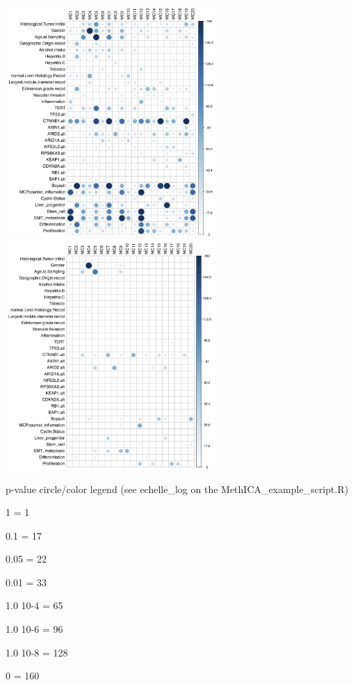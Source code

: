 \documentclass[]{article}
\begin{document}
\includegraphics[width=0.6\textwidth,height=0.6\textheight]{./corrplot_uni.png}
\includegraphics[width=0.6\textwidth,height=0.6\textheight]{./corrplot_multi.png}

p-value circle/color legend (see echelle\_log on the
MethICA\_example\_script.R)

1 = 1

0.1 = 17

0.05 = 22

0.01 = 33

1.0 10-4 = 65

1.0 10-6 = 96

1.0 10-8 = 128

0 = 160
\end{document}
